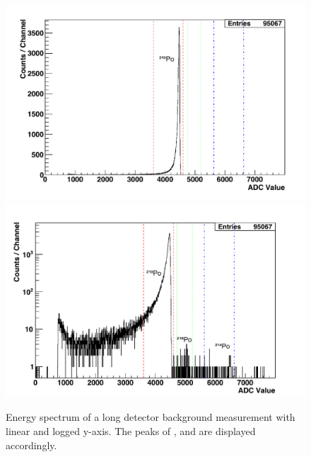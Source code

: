 \begin{figure}[b!]
    \centering
    \includegraphics[scale=0.43]{Chapter_4/Figures/det_background/Spectrum_det_background.pdf}
    \includegraphics[scale=0.43]{Chapter_4/Figures/det_background/LogSpectrum_det_background.pdf}
    \caption[Energy spectrum of a long radon emanation detector backgrounds showing the peaks of \PoTOZ{}, \PoTOE{} and \PoTOF{}.]
    {Energy spectrum of a long detector background measurement with linear and logged y-axis. The peaks of \PoTOZ{}, \PoTOE{} and \PoTOF{} are displayed accordingly.}
    \label{fig:detector_background_spectrum}
\end{figure}
%

